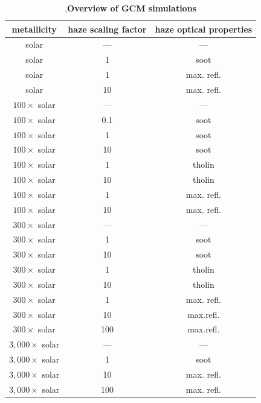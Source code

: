 \documentclass[pdflatex,sn-standardnature]{sn-jnl}%
\begin{document}
\begin{table}
    \footnotesize
    \caption{\sep\textbf{Overview of GCM simulations}}
    \centering
    \setlength{\tabcolsep}{6pt}
    \renewcommand*{\arraystretch}{1.4}
    \begin{tabular}{c c c}
        \hline \hline
        metallicity &  haze scaling factor & haze optical properties \\
        \hline
		solar & --- & ---  \\
  		solar & 1 & soot  \\
      	solar & 1 & max. refl.  \\
            solar & 10 & max. refl.\\
		$100 \times$ solar & --- & ---  \\
		$100 \times$ solar & 0.1 & soot  \\
  		$100 \times$ solar & 1 & soot  \\
		$100 \times$ solar & 10 & soot  \\
    	$100 \times$ solar & 1 & tholin  \\
		$100 \times$ solar & 10 & tholin  \\
    	$100 \times$ solar & 1 & max. refl.  \\
		$100 \times$ solar & 10 & max. refl.  \\
		$300 \times$ solar & --- & ---  \\
		$300 \times$ solar & 1 & soot  \\
		$300 \times$ solar & 10 & soot  \\
		$300 \times$ solar & 1 & tholin  \\
		$300 \times$ solar & 10 & tholin  \\
		$300 \times$ solar & 1 & max. refl.  \\
		$300 \times$ solar & 10 & max.refl.  \\
		$300 \times$ solar & 100 & max.refl.  \\
		$3,000 \times$ solar & --- & ---  \\ 
		$3,000 \times$ solar & 1 & soot  \\ 
		$3,000 \times$ solar & 10 & max. refl. \\ 
		$3,000 \times$ solar & 100 & max. refl.  \\ 
		\hline
		\hline 
    \end{tabular}
    \label{tab:gcm_overview}
\end{table}
\end{document}
